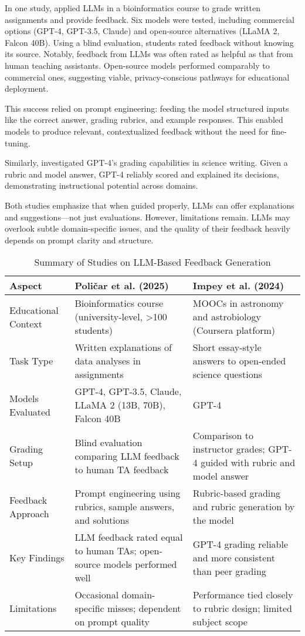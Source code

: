 In one study, \citet{polikar2025} applied LLMs in a bioinformatics course to grade written assignments and provide feedback. Six models were tested, including commercial options (GPT-4, GPT-3.5, Claude) and open-source alternatives (LLaMA 2, Falcon 40B). Using a blind evaluation, students rated feedback without knowing its source. Notably, feedback from LLMs was often rated as helpful as that from human teaching assistants. Open-source models performed comparably to commercial ones, suggesting viable, privacy-conscious pathways for educational deployment.

This success relied on prompt engineering: feeding the model structured inputs like the correct answer, grading rubrics, and example responses. This enabled models to produce relevant, contextualized feedback without the need for fine-tuning.

Similarly, \citet{impey2024} investigated GPT-4's grading capabilities in science writing. Given a rubric and model answer, GPT-4 reliably scored and explained its decisions, demonstrating instructional potential across domains.

Both studies emphasize that when guided properly, LLMs can offer explanations and suggestions—not just evaluations. However, limitations remain. LLMs may overlook subtle domain-specific issues, and the quality of their feedback heavily depends on prompt clarity and structure.

\begin{table}[h]
  \centering
  \caption{Summary of Studies on LLM-Based Feedback Generation}
  \label{tab:llm_feedback_studies}
  \begin{tabular}{@{}p{3.5cm}p{6.5cm}p{6.5cm}@{}}
  \toprule
  \textbf{Aspect} & \textbf{Poličar et al. (2025)} & \textbf{Impey et al. (2024)} \\
  \midrule
  Educational Context & Bioinformatics course (university-level, >100 students) & MOOCs in astronomy and astrobiology (Coursera platform) \\
  \midrule
  Task Type & Written explanations of data analyses in assignments & Short essay-style answers to open-ended science questions \\
  \midrule
  Models Evaluated & GPT-4, GPT-3.5, Claude, LLaMA 2 (13B, 70B), Falcon 40B & GPT-4 \\
  \midrule
  Grading Setup & Blind evaluation comparing LLM feedback to human TA feedback & Comparison to instructor grades; GPT-4 guided with rubric and model answer \\
  \midrule
  Feedback Approach & Prompt engineering using rubrics, sample answers, and solutions & Rubric-based grading and rubric generation by the model \\
  \midrule
  Key Findings & LLM feedback rated equal to human TAs; open-source models performed well & GPT-4 grading reliable and more consistent than peer grading \\
  \midrule
  Limitations & Occasional domain-specific misses; dependent on prompt quality & Performance tied closely to rubric design; limited subject scope \\
  \bottomrule
  \end{tabular}
\end{table}

